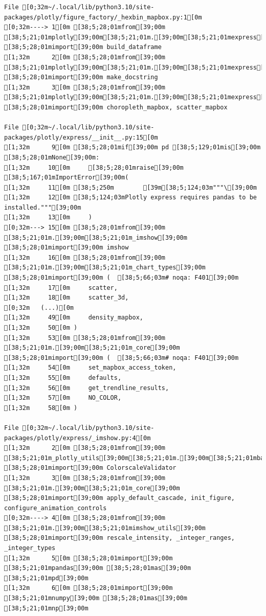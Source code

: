 \documentclass[
  letterpaper,
]{book}
\begin{document}
\begin{verbatim}
File [0;32m~/.local/lib/python3.10/site-packages/plotly/figure_factory/_hexbin_mapbox.py:1[0m
[0;32m----> 1[0m [38;5;28;01mfrom[39;00m [38;5;21;01mplotly[39;00m[38;5;21;01m.[39;00m[38;5;21;01mexpress[39;00m[38;5;21;01m.[39;00m[38;5;21;01m_core[39;00m [38;5;28;01mimport[39;00m build_dataframe
[1;32m      2[0m [38;5;28;01mfrom[39;00m [38;5;21;01mplotly[39;00m[38;5;21;01m.[39;00m[38;5;21;01mexpress[39;00m[38;5;21;01m.[39;00m[38;5;21;01m_doc[39;00m [38;5;28;01mimport[39;00m make_docstring
[1;32m      3[0m [38;5;28;01mfrom[39;00m [38;5;21;01mplotly[39;00m[38;5;21;01m.[39;00m[38;5;21;01mexpress[39;00m[38;5;21;01m.[39;00m[38;5;21;01m_chart_types[39;00m [38;5;28;01mimport[39;00m choropleth_mapbox, scatter_mapbox

File [0;32m~/.local/lib/python3.10/site-packages/plotly/express/__init__.py:15[0m
[1;32m      9[0m [38;5;28;01mif[39;00m pd [38;5;129;01mis[39;00m [38;5;28;01mNone[39;00m:
[1;32m     10[0m     [38;5;28;01mraise[39;00m [38;5;167;01mImportError[39;00m(
[1;32m     11[0m [38;5;250m        [39m[38;5;124;03m"""\[39;00m
[1;32m     12[0m [38;5;124;03mPlotly express requires pandas to be installed."""[39;00m
[1;32m     13[0m     )
[0;32m---> 15[0m [38;5;28;01mfrom[39;00m [38;5;21;01m.[39;00m[38;5;21;01m_imshow[39;00m [38;5;28;01mimport[39;00m imshow
[1;32m     16[0m [38;5;28;01mfrom[39;00m [38;5;21;01m.[39;00m[38;5;21;01m_chart_types[39;00m [38;5;28;01mimport[39;00m (  [38;5;66;03m# noqa: F401[39;00m
[1;32m     17[0m     scatter,
[1;32m     18[0m     scatter_3d,
[0;32m   (...)[0m
[1;32m     49[0m     density_mapbox,
[1;32m     50[0m )
[1;32m     53[0m [38;5;28;01mfrom[39;00m [38;5;21;01m.[39;00m[38;5;21;01m_core[39;00m [38;5;28;01mimport[39;00m (  [38;5;66;03m# noqa: F401[39;00m
[1;32m     54[0m     set_mapbox_access_token,
[1;32m     55[0m     defaults,
[1;32m     56[0m     get_trendline_results,
[1;32m     57[0m     NO_COLOR,
[1;32m     58[0m )

File [0;32m~/.local/lib/python3.10/site-packages/plotly/express/_imshow.py:4[0m
[1;32m      2[0m [38;5;28;01mfrom[39;00m [38;5;21;01m_plotly_utils[39;00m[38;5;21;01m.[39;00m[38;5;21;01mbasevalidators[39;00m [38;5;28;01mimport[39;00m ColorscaleValidator
[1;32m      3[0m [38;5;28;01mfrom[39;00m [38;5;21;01m.[39;00m[38;5;21;01m_core[39;00m [38;5;28;01mimport[39;00m apply_default_cascade, init_figure, configure_animation_controls
[0;32m----> 4[0m [38;5;28;01mfrom[39;00m [38;5;21;01m.[39;00m[38;5;21;01mimshow_utils[39;00m [38;5;28;01mimport[39;00m rescale_intensity, _integer_ranges, _integer_types
[1;32m      5[0m [38;5;28;01mimport[39;00m [38;5;21;01mpandas[39;00m [38;5;28;01mas[39;00m [38;5;21;01mpd[39;00m
[1;32m      6[0m [38;5;28;01mimport[39;00m [38;5;21;01mnumpy[39;00m [38;5;28;01mas[39;00m [38;5;21;01mnp[39;00m


\end{verbatim}
\end{document}
